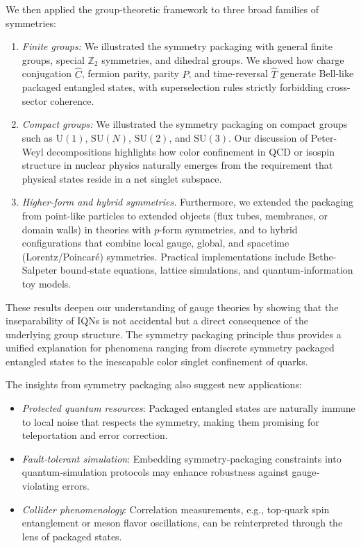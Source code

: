 \documentclass[12pt,a4paper]{article}
\begin{document}
We then applied the group-theoretic framework to three broad families of symmetries:
\begin{enumerate}
	\item \textit{Finite groups:}
	We illustrated the symmetry packaging with general finite groups, special $\mathbb{Z}_2$ symmetries, and dihedral groups.
	We showed how charge conjugation $\hat{C}$, fermion parity, parity $\hat{P}$, and time-reversal $\hat{T}$ generate Bell-like packaged entangled states, with superselection rules strictly forbidding cross-sector coherence.
	
	\item \textit{Compact groups:}
	We illustrated the symmetry packaging on compact groups such as $\mathrm{U}(1)$, $\mathrm{SU}(N)$, $\mathrm{SU}(2)$, and $\mathrm{SU}(3)$.
	Our discussion of Peter-Weyl decompositions highlights how color confinement in QCD or isospin structure in nuclear physics naturally emerges from the requirement that physical states reside in a net singlet subspace.
	
	\item\textit{Higher-form and hybrid symmetries.}
	Furthermore, we extended the packaging from point-like particles to extended objects (flux tubes, membranes, or domain walls) in theories with $p$-form symmetries, and to hybrid configurations that combine local gauge, global, and spacetime (Lorentz/Poincaré) symmetries.
	Practical implementations include Bethe-Salpeter bound‐state equations, lattice simulations, and quantum‐information toy models.
\end{enumerate}


These results deepen our understanding of gauge theories by showing that the inseparability of IQNs is not accidental but a direct consequence of the underlying group structure.
The symmetry packaging principle thus provides a unified explanation for phenomena ranging from discrete symmetry packaged entangled states to the inescapable color singlet confinement of quarks.


The insights from symmetry packaging also suggest new applications:
\begin{itemize}
	\item \emph{Protected quantum resources}:
	Packaged entangled states are naturally immune to local noise that respects the symmetry, making them promising for teleportation and error correction.
	
	\item \emph{Fault‐tolerant simulation}:
	Embedding symmetry‐packaging constraints into quantum‐simulation protocols may enhance robustness against gauge‐violating errors.
	
	\item \emph{Collider phenomenology}:
	Correlation measurements, e.g., top‐quark spin entanglement or meson flavor oscillations, can be reinterpreted through the lens of packaged states.
\end{itemize}
\end{document}
